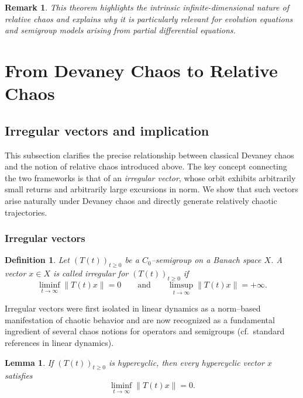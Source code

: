 \documentclass[12pt]{article}
\newtheorem{lemma}[theorem]{Lemma}
\newtheorem{definition}[theorem]{Definition}
\newtheorem{remark}[theorem]{Remark}
\begin{document}
\begin{remark}
This theorem highlights the intrinsic infinite-dimensional nature of relative chaos and explains why it is particularly relevant for evolution equations and semigroup models arising from partial differential equations.
\end{remark}


\section{From Devaney Chaos to Relative Chaos}\label{DERE}
\subsection{Irregular vectors and implication}

This subsection clarifies the precise relationship between classical Devaney chaos and the notion of relative chaos introduced above. The key concept connecting the two frameworks is that of an
\emph{irregular vector}, whose orbit exhibits arbitrarily small returns and arbitrarily large excursions in norm. We show that such vectors arise naturally under Devaney chaos and directly generate relatively chaotic trajectories.

\subsubsection*{Irregular vectors}

\begin{definition}
Let $(T(t))_{t\ge 0}$ be a $C_0$--semigroup on a Banach space $X$.
A vector $x\in X$ is called \emph{irregular} for $(T(t))_{t\ge 0}$ if
\[
\liminf_{t\to\infty}\|T(t)x\|=0
\qquad\text{and}\qquad
\limsup_{t\to\infty}\|T(t)x\|=+\infty.
\]
\end{definition}

Irregular vectors were first isolated in linear dynamics as a norm--based manifestation of chaotic behavior and are now recognized as a fundamental ingredient of several chaos notions for operators and semigroups (cf.\ standard references in linear dynamics).

\begin{lemma}\label{lem:hc_liminf}
If $(T(t))_{t\ge 0}$ is hypercyclic, then every hypercyclic vector $x$ satisfies
\[
\liminf_{t\to\infty}\|T(t)x\|=0.
\]
\end{lemma}
\end{document}
